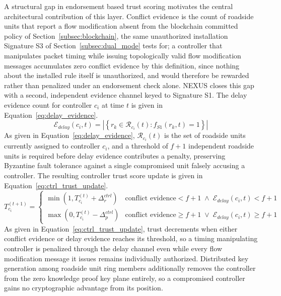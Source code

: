 \documentclass[lettersize,journal]{IEEEtran}
\theoremstyle{plain}
\theoremstyle{remark}
\begin{document}
	A structural gap in endorsement based trust scoring motivates the central
	architectural contribution of this layer. Conflict evidence is the count
	of roadside units that report a flow modification absent from the
	blockchain committed policy of Section~\ref{subsec:blockchain}, the same
	unauthorized installation Signature S3 of
	Section~\ref{subsec:dual_mode} tests for; a controller that manipulates
	packet timing while issuing topologically valid flow modification
	messages accumulates zero conflict evidence by this definition, since
	nothing about the installed rule itself is unauthorized, and would
	therefore be rewarded rather than penalized under an endorsement check
	alone. NEXUS closes this gap with a second, independent evidence channel
	keyed to Signature S1. The delay evidence count for controller $c_i$ at
	time $t$ is given in Equation~\eqref{eq:delay_evidence}.
	\begin{equation}
		\mathcal{E}_{delay}(c_i,t) =
		\left|\left\{
		r_k \in \mathcal{R}_{c_i}(t) :
		f_{S1}(r_k,t) = 1
		\right\}\right|
		\label{eq:delay_evidence}
	\end{equation}
	As given in Equation~\eqref{eq:delay_evidence}, $\mathcal{R}_{c_i}(t)$ is
	the set of roadside units currently assigned to controller $c_i$, and a
	threshold of $f{+}1$ independent roadside units is required before delay
	evidence contributes a penalty, preserving Byzantine fault tolerance
	against a single compromised unit falsely accusing a controller. The
	resulting controller trust score update is given in
	Equation~\eqref{eq:ctrl_trust_update}.
	\begin{equation}
		T_{c_i}^{(t+1)}{=}
		\begin{cases}
			\min(1,T_{c_i}^{(t)}{+}\Delta_r^{ctrl}) &
			\text{conflict evidence}{<}f{+}1
			\;\land\;
			\mathcal{E}_{delay}(c_i,t){<}f{+}1
			\\
			\max(0,T_{c_i}^{(t)}{-}\Delta_p^{ctrl}) &
			\text{conflict evidence}{\geq}f{+}1
			\;\lor\;
			\mathcal{E}_{delay}(c_i,t){\geq}f{+}1
		\end{cases}
		\label{eq:ctrl_trust_update}
	\end{equation}
	As given in Equation~\eqref{eq:ctrl_trust_update}, trust decrements when
	either conflict evidence or delay evidence reaches its threshold, so a
	timing manipulating controller is penalized through the delay channel
	even while every flow modification message it issues remains individually
	authorized. Distributed key generation among roadside unit ring members
	additionally removes the controller from the zero knowledge proof key
	plane entirely, so a compromised controller gains no cryptographic
	advantage from its position.
	
\end{document}
